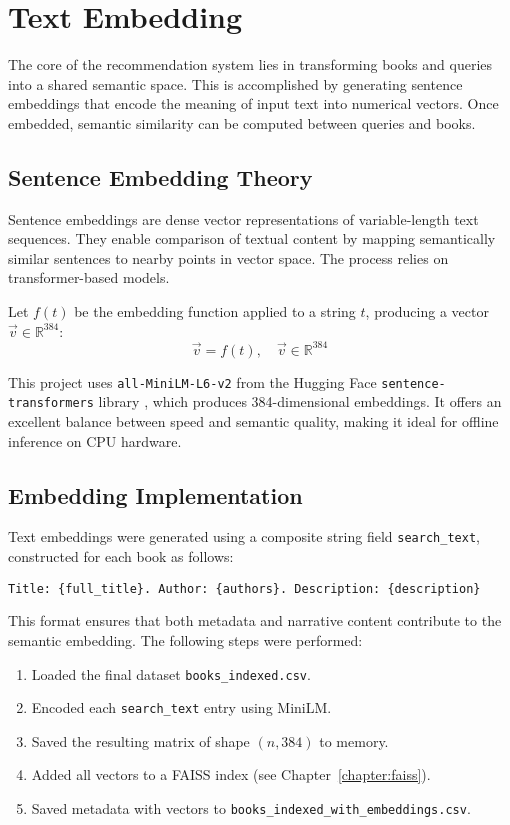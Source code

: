 \chapter{Text Embedding}
\label{chapter:embedding}

The core of the recommendation system lies in transforming books and queries into a shared semantic space. 
This is accomplished by generating sentence embeddings that encode the meaning of input text into numerical vectors. Once embedded, semantic similarity can be computed between queries and books.

\section{Sentence Embedding Theory}
\label{sec:embedding-theory}

Sentence embeddings are dense vector representations of variable-length text sequences. 
They enable comparison of textual content by mapping semantically similar sentences to nearby points in vector space. The process relies on transformer-based models.

Let $f(t)$ be the embedding function applied to a string $t$, producing a vector $\vec{v} \in \mathbb{R}^{384}$:
\begin{equation}
\vec{v} = f(t), \quad \vec{v} \in \mathbb{R}^{384}
\end{equation}

This project uses \texttt{all-MiniLM-L6-v2} from the Hugging Face \texttt{sentence-transformers} library \parencite{sentence-transformers}, which produces 384-dimensional embeddings. 
It offers an excellent balance between speed and semantic quality, making it ideal for offline inference on CPU hardware.

\section{Embedding Implementation}
\label{sec:embedding-implementation}

Text embeddings were generated using a composite string field \texttt{search\_text}, constructed for each book as follows:

\begin{verbatim}
Title: {full_title}. Author: {authors}. Description: {description}
\end{verbatim}

This format ensures that both metadata and narrative content contribute to the semantic embedding. The following steps were performed:
\begin{enumerate}
    \item Loaded the final dataset \texttt{books\_indexed.csv}.
    \item Encoded each \texttt{search\_text} entry using MiniLM.
    \item Saved the resulting matrix of shape $(n, 384)$ to memory.
    \item Added all vectors to a FAISS index (see Chapter~\ref{chapter:faiss}).
    \item Saved metadata with vectors to \texttt{books\_indexed\_with\_embeddings.csv}.
\end{enumerate}

